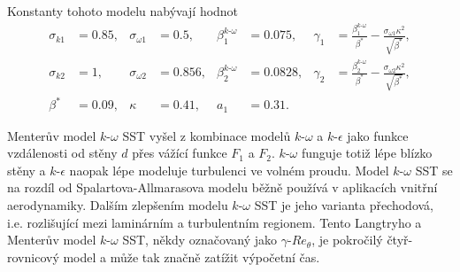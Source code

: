Konstanty tohoto modelu nabývají hodnot
\begin{align*}
\sigma_{k1} &= 0.85,  &\sigma_{\omega 1} &= 0.5,  &\beta_1^{k\text{-}\omega} &= 0.075,  &\gamma_1 &= \frac{\beta_1^{k\text{-}\omega}}{\beta^\ast} - \frac{\sigma_{\omega 1}\kappa^2}{\sqrt{\beta^\ast}},\\
\sigma_{k2} &= 1,  &\sigma_{\omega 2} &= 0.856,  &\beta_2^{k\text{-}\omega} &= 0.0828,  &\gamma_2 &= \frac{\beta_2^{k\text{-}\omega}}{\beta^\ast} - \frac{\sigma_{\omega 2}\kappa^2}{\sqrt{\beta^\ast}},\\
\beta^\ast &= 0.09,  &\kappa &= 0.41,  &a_1 &= 0.31.
\end{align*} 

Menterův model $ k\text{-}\omega $ SST vyšel z kombinace modelů $ k\text{-}\omega $ a $ k\text{-}\epsilon $ jako funkce vzdálenosti od stěny $ d $ přes vážící funkce $ F_1 $ a $ F_2 $. $ k\text{-}\omega $ funguje totiž lépe blízko stěny a $ k\text{-}\epsilon $ naopak lépe modeluje turbulenci ve volném proudu. Model $ k\text{-}\omega $ SST se na rozdíl od Spalartova-Allmarasova modelu běžně používá v aplikacích vnitřní aerodynamiky. Dalším zlepšením modelu $ k\text{-}\omega $ SST je jeho varianta přechodová, i.e. rozlišující mezi laminárním a turbulentním regionem. Tento Langtryho a Menterův model $ k\text{-}\omega $ SST, někdy označovaný jako $ \gamma\text{-}Re_\theta $, je pokročilý čtyř-rovnicový model a může tak značně zatížit výpočetní čas.

